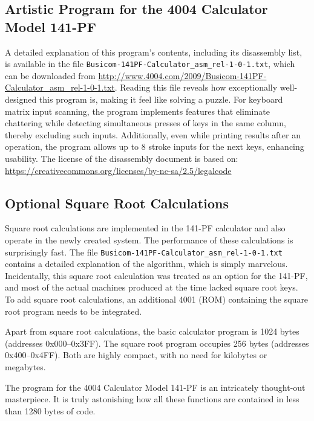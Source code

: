\subsection{Artistic Program for the 4004 Calculator Model 141-PF}
A detailed explanation of this program's contents, including its disassembly list, is available in the file \texttt{Busicom-141PF-Calculator\_asm\_rel-1-0-1.txt}, which can be downloaded from \url{http://www.4004.com/2009/Busicom-141PF-Calculator_asm_rel-1-0-1.txt}. Reading this file reveals how exceptionally well-designed this program is, making it feel like solving a puzzle. For keyboard matrix input scanning, the program implements features that eliminate chattering while detecting simultaneous presses of keys in the same column, thereby excluding such inputs. Additionally, even while printing results after an operation, the program allows up to 8 stroke inputs for the next keys, enhancing usability.
The license of the disassembly document is based on: \\
\url{https://creativecommons.org/licenses/by-nc-sa/2.5/legalcode}

\subsection{Optional Square Root Calculations}
Square root calculations are implemented in the 141-PF calculator and also operate in the newly created system. The performance of these calculations is surprisingly fast. The file \texttt{Busicom-141PF-Calculator\_asm\_rel-1-0-1.txt} contains a detailed explanation of the algorithm, which is simply marvelous. Incidentally, this square root calculation was treated as an option for the 141-PF, and most of the actual machines produced at the time lacked square root keys. To add square root calculations, an additional 4001 (ROM) containing the square root program needs to be integrated. 

Apart from square root calculations, the basic calculator program is 1024 bytes (addresses 0x000–0x3FF). The square root program occupies 256 bytes (addresses 0x400–0x4FF). Both are highly compact, with no need for kilobytes or megabytes. 

The program for the 4004 Calculator Model 141-PF is an intricately thought-out masterpiece. It is truly astonishing how all these functions are contained in less than 1280 bytes of code.

